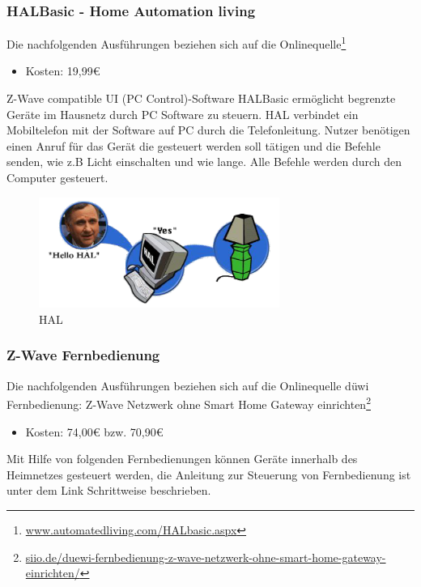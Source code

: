 \subsubsection{HALBasic - Home Automation living}
Die nachfolgenden Ausführungen beziehen sich auf die Onlinequelle\footnote{\url{www.automatedliving.com/HALbasic.aspx}}

\begin{itemize}
\item Kosten: 19,99€
\end{itemize}

\noindent
Z-Wave compatible UI (PC Control)-Software HALBasic ermöglicht begrenzte Geräte im Hausnetz
durch PC Software zu steuern. HAL verbindet ein Mobiltelefon mit der Software auf PC durch die Telefonleitung. Nutzer benötigen einen Anruf für das Gerät die gesteuert werden soll tätigen und die Befehle senden, wie z.B Licht einschalten und wie lange. Alle Befehle werden durch den Computer gesteuert.

\begin{figure}[h!]
	\centering
	\includegraphics[width=0.7\textwidth]{img/Feedback-Mechanismen/HAL.png}
	\caption{HAL}
	\label{fig:feedbackHAL}
\end{figure}

\subsubsection{Z-Wave Fernbedienung}
Die nachfolgenden Ausführungen beziehen sich auf die Onlinequelle \glqq düwi Fernbedienung: Z-Wave Netzwerk ohne Smart Home Gateway einrichten\grqq\footnote{\url{siio.de/duewi-fernbedienung-z-wave-netzwerk-ohne-smart-home-gateway-einrichten/}}

\begin{itemize}
\item Kosten: 74,00€ bzw. 70,90€
\end{itemize}

\noindent
Mit Hilfe von folgenden Fernbedienungen können Geräte innerhalb des Heimnetzes gesteuert werden, die Anleitung zur Steuerung von Fernbedienung ist unter dem Link Schrittweise beschrieben.

